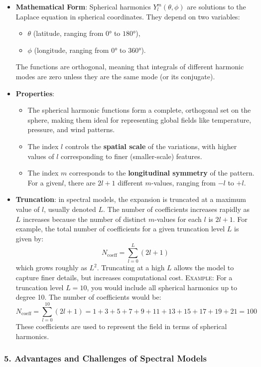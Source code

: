 \begin{itemize}
	\item \textbf{Mathematical Form}: Spherical harmonics $Y_l^m(\theta,\phi)$ are solutions to the Laplace equation in spherical coordinates. They depend on two variables:
	      \begin{itemize}
		      \item $\theta$ (latitude, ranging from $0°$ to $180°$),
		      \item $\phi$ (longitude, ranging from $0°$ to $360°$).
	      \end{itemize}The functions are orthogonal, meaning that integrals of different harmonic modes are zero unless they are the same mode (or its conjugate).
	\item \textbf{Properties}:
	      \begin{itemize}
		      \item The spherical harmonic functions form a complete, orthogonal set on the sphere, making them ideal for representing global fields like temperature, pressure, and wind patterns.
		      \item The index $l$ controls the \textbf{spatial scale} of the variations, with higher values of $l$ corresponding to finer (smaller-scale) features.
		      \item The index $m$ corresponds to the \textbf{longitudinal symmetry} of the pattern. For a given$l$, there are $2l+1$ different $m$-values, ranging from $-l$ to $+l$.
	      \end{itemize}
	\item \textbf{Truncation}: in spectral models, the expansion is truncated at a maximum value of $l$, usually denoted $L$. The number of coefficients increases rapidly as $L$ increases because the number of distinct $m$-values for each $l$ is $2l+1$. For example, the total number of coefficients for a given truncation level $L$ is given by:
	      $$N_{\text{coeff}}=\displaystyle\sum_{l=0}^L(2l+1)$$
	      which grows roughly as $L^2$. Truncating at a high $L$ allows the model to capture finer details, but increases computational cost.
	      \textsc{Example}: For a truncation level $L=10$, you would include all spherical harmonics up to degree 10. The number of coefficients would be:$$N_{\text{coeff}}=\displaystyle\sum_{l=0}^{10}(2l+1)=1+3+5+7+9+11+13+15+17+19+21=100$$
	      These coefficients are used to represent the field in terms of spherical harmonics.
\end{itemize}

\subsubsection{5. Advantages and Challenges of Spectral Models}

